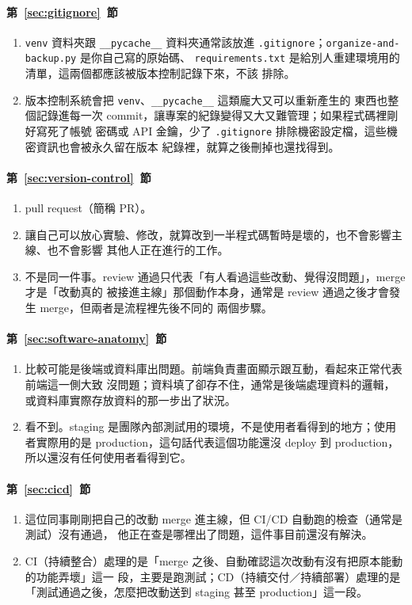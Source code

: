 \paragraph{第~\ref{sec:gitignore}~節}
\begin{enumerate}
\item \texttt{venv} 資料夾跟 \texttt{\_\_pycache\_\_} 資料夾通常該放進
\texttt{.gitignore}；\texttt{organize-and-backup.py} 是你自己寫的原始碼、
\texttt{requirements.txt} 是給別人重建環境用的清單，這兩個都應該被版本控制記錄下來，不該
排除。
\item 版本控制系統會把 \texttt{venv}、\texttt{\_\_pycache\_\_} 這類龐大又可以重新產生的
東西也整個記錄進每一次 commit，讓專案的紀錄變得又大又難管理；如果程式碼裡剛好寫死了帳號
密碼或 API 金鑰，少了 \texttt{.gitignore} 排除機密設定檔，這些機密資訊也會被永久留在版本
紀錄裡，就算之後刪掉也還找得到。
\end{enumerate}

\paragraph{第~\ref{sec:version-control}~節}
\begin{enumerate}
\item pull request（簡稱 PR）。
\item 讓自己可以放心實驗、修改，就算改到一半程式碼暫時是壞的，也不會影響主線、也不會影響
其他人正在進行的工作。
\item 不是同一件事。review 通過只代表「有人看過這些改動、覺得沒問題」，merge 才是「改動真的
被接進主線」那個動作本身，通常是 review 通過之後才會發生 merge，但兩者是流程裡先後不同的
兩個步驟。
\end{enumerate}

\paragraph{第~\ref{sec:software-anatomy}~節}
\begin{enumerate}
\item 比較可能是後端或資料庫出問題。前端負責畫面顯示跟互動，看起來正常代表前端這一側大致
沒問題；資料填了卻存不住，通常是後端處理資料的邏輯，或資料庫實際存放資料的那一步出了狀況。
\item 看不到。staging 是團隊內部測試用的環境，不是使用者看得到的地方；使用者實際用的是
production，這句話代表這個功能還沒 deploy 到 production，所以還沒有任何使用者看得到它。
\end{enumerate}

\paragraph{第~\ref{sec:cicd}~節}
\begin{enumerate}
\item 這位同事剛剛把自己的改動 merge 進主線，但 CI/CD 自動跑的檢查（通常是測試）沒有通過，
他正在查是哪裡出了問題，這件事目前還沒有解決。
\item CI（持續整合）處理的是「merge 之後、自動確認這次改動有沒有把原本能動的功能弄壞」這一
段，主要是跑測試；CD（持續交付／持續部署）處理的是「測試通過之後，怎麼把改動送到 staging
甚至 production」這一段。
\end{enumerate}

